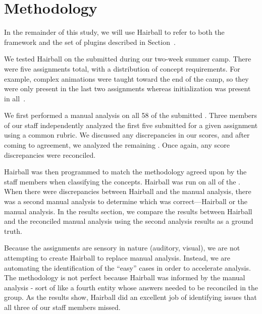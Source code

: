 \section{Methodology} 
In the remainder of this study, we will use Hairball to refer to both the
framework and the set of plugins described in Section~.

We tested Hairball on the  submitted during our two-week summer
camp.  There were five assignments total, with a distribution of concept
requirements. For example, complex animations were taught toward the end of the
camp, so they were only present in the last two assignments whereas
initialization was present in all~\cite{Franklin:2013:SBO}.

We first performed a manual analysis on all 58 of the submitted .
Three members of our staff independently analyzed the first five 
submitted for a given assignment using a common rubric. We discussed any
discrepancies in our scores, and after coming to agreement, we analyzed the
remaining .  Once again, any score discrepancies were reconciled.

Hairball was then programmed to match the methodology agreed upon by the staff
members when classifying the concepts.  Hairball was run on all of the
.  When there were discrepancies between Hairball and the manual
analysis, there was a second manual analysis to determine which was
correct---Hairball or the manual analysis.  In the results section, we compare
the results between Hairball and the reconciled manual analysis using the
second analysis results as a ground truth.

Because the assignments are sensory in nature (auditory, visual), we are not
attempting to create Hairball to replace manual analysis.  Instead, we are
automating the identification of the ``easy'' cases in order to accelerate
analysis.  The methodology is not perfect because Hairball was informed by the
manual analysis - sort of like a fourth entity whose answers needed to be
reconciled in the group.  As the results show, Hairball did an excellent job of
identifying issues that all three of our staff members missed.
